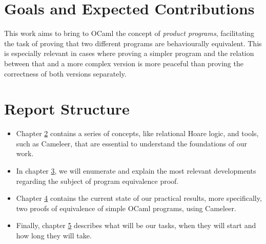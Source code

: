 \section{Goals and Expected Contributions}

This work aims to bring to OCaml the concept of \emph{product programs}, facilitating the task of proving that two different programs are behaviourally equivalent.
This is especially relevant in cases where proving a simpler program and the relation between that and a more complex version is more peaceful than proving the correctness of both versions separately.


\section{Report Structure}

\begin{itemize}
    \setlength\itemsep{0.1em}
    \item Chapter \hyperref[cha:background]{2} contains a series of concepts, like relational Hoare logic, and tools, such as Cameleer, that are essential to understand the foundations of our work.

    \item In chapter \hyperref[cha:state_of_the_art]{3}, we will enumerate and explain the most relevant developments regarding the subject of program equivalence proof.

    \item Chapter \hyperref[cha:preliminary_results]{4} contains the current state of our practical results, more specifically, two proofs of equivalence of simple OCaml programs, using Cameleer.

    \item Finally, chapter \hyperref[cha:work_plan]{5} describes what will be our tasks, when they will start and how long they will take.

\end{itemize}

